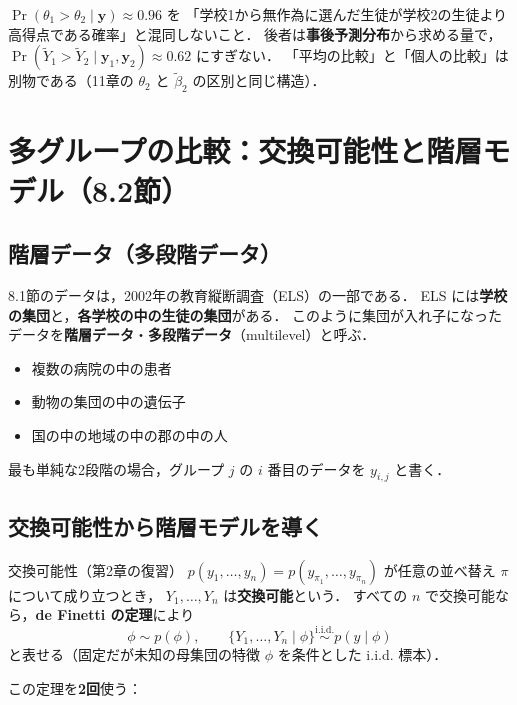 \documentclass[lualatex,ja=standard,a4paper,12pt]{bxjsarticle}
\begin{document}
\begin{warningbox}
$\Pr(\theta_1 > \theta_2 \mid \bm{y}) \approx 0.96$ を
「学校1から無作為に選んだ生徒が学校2の生徒より高得点である確率」と混同しないこと．
後者は\textbf{事後予測分布}から求める量で，$\Pr(\tilde{Y}_1 > \tilde{Y}_2 \mid \bm{y}_1, \bm{y}_2) \approx 0.62$ にすぎない．
「平均の比較」と「個人の比較」は別物である（11章の $\theta_2$ と $\tilde{\beta}_2$ の区別と同じ構造）．
\end{warningbox}

\section{多グループの比較：交換可能性と階層モデル（8.2節）}

\subsection{階層データ（多段階データ）}

8.1節のデータは，2002年の教育縦断調査（ELS）の一部である．
ELS には\textbf{学校の集団}と，\textbf{各学校の中の生徒の集団}がある．
このように集団が入れ子になったデータを\textbf{階層データ}・\textbf{多段階データ}（multilevel）と呼ぶ．
\begin{itemize}
  \item 複数の病院の中の患者
  \item 動物の集団の中の遺伝子
  \item 国の中の地域の中の郡の中の人
\end{itemize}
最も単純な2段階の場合，グループ $j$ の $i$ 番目のデータを $y_{i,j}$ と書く．

\subsection{交換可能性から階層モデルを導く}

\begin{defbox}{交換可能性（第2章の復習）}
$p(y_1, \ldots, y_n) = p(y_{\pi_1}, \ldots, y_{\pi_n})$ が任意の並べ替え $\pi$ について成り立つとき，
$Y_1, \ldots, Y_n$ は\textbf{交換可能}という．
すべての $n$ で交換可能なら，\textbf{de Finetti の定理}により
\[
  \phi \sim p(\phi), \qquad \{Y_1, \ldots, Y_n \mid \phi\} \overset{\text{i.i.d.}}{\sim} p(y \mid \phi)
\]
と表せる（固定だが未知の母集団の特徴 $\phi$ を条件とした i.i.d. 標本）．
\end{defbox}

\noindent この定理を\textbf{2回}使う：
\end{document}
